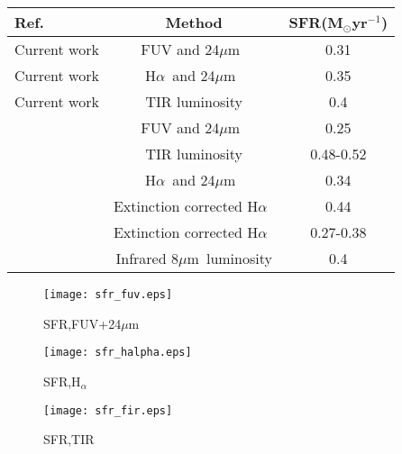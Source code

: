 \documentclass[useAMS,usenatbib]{mn2e}
\newcommand \halpha    {H$\alpha $\ }
\newcommand \um    {$\mu$m\ }
\begin{document}
\begin{table*}
\begin{minipage}{100mm}
\caption{Comparison of Total Star Formation Rate of M31}
\label{table:sfr}
\begin{tabular}{@{}lcc}
\hline\hline
Ref.&Method&SFR(M$_{\odot}$yr$^{-1}$) \\
\hline
Current work&FUV and 24\um&0.31\\
Current work&\halpha and 24\um&0.35\\
Current work&TIR luminosity&0.4\\
\cite{Ford13}&FUV and 24\um&0.25\\
\cite{Ford13}&TIR luminosity&0.48-0.52\\
\cite{Azimlu11}& \halpha and 24\um&0.34\\
\cite{Azimlu11}&Extinction corrected \halpha&0.44\\
\cite{Tabatabaei10}&Extinction corrected \halpha&0.27-0.38\\
\cite{Barmby06}&Infrared 8\um luminosity& 0.4\\
\hline
\end{tabular}
\end{minipage}
\end{table*}



\begin{figure*}
    \centering
    \begin{subfigure}[b]{1\textwidth}
        \centering
        \texttt{[image: sfr\_fuv.eps]}
        \caption{SFR,FUV+24\um}
        \label{fig:sfr,fuv}
    \end{subfigure}
    \hfill
    \begin{subfigure}[b]{1\textwidth}
        \centering
        \texttt{[image: sfr\_halpha.eps]}
        \caption{SFR,H$_{\alpha}$}
        \label{fig:sfr_halpha}
    \end{subfigure}
    \hfill
    \begin{subfigure}[b]{1\textwidth}
        \centering
        \texttt{[image: sfr\_fir.eps]}
        \caption{SFR,TIR}
        \label{fig:sfr,fir}
    \end{subfigure}
    \caption{SFR map from a combination of FUV + 24\um emission (top), \halpha and 24\um emission (middle), and total infrared emission (bottom)}
    \label{fig:sfrs}
\end{figure*}
\end{document}

